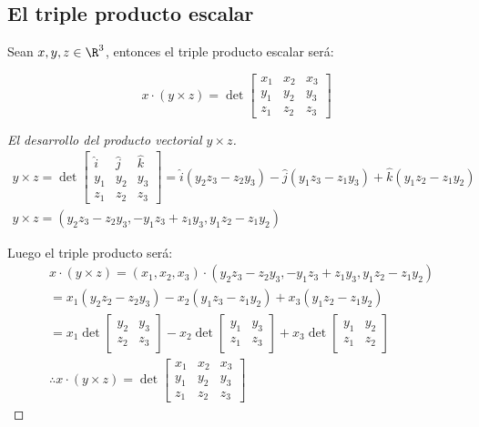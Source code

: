 \subsection{El triple producto escalar}

Sean $x,y,z\in \R^3$, entonces el triple producto escalar será:

\begin{equation}
	x\cdot\left(y\times z\right)= \det\begin{bmatrix}
		x_1 & x_2 & x_3 \\y_1&y_2&y_3\\ z_1&z_2&z_3
	\end{bmatrix}
\end{equation}

\begin{proof}[El desarrollo del producto vectorial $y\times z$]
	\begin{align*}
		y\times z=\det\begin{bmatrix}
			              \hat{i} & \hat{j} & \hat{k} \\y_1&y_2&y_3\\ z_1&z_2&z_3
		              \end{bmatrix}=\hat{i}(y_2z_3-z_2y_3)-\hat{j}(y_1z_3-z_1y_3)+\hat{k}(y_1z_2-z_1y_2) \\
		y\times z=\left(y_2z_3-z_2y_3,-y_1z_3+z_1y_3,y_1z_2-z_1y_2\right)
	\end{align*}

	Luego el triple producto será:
	\begin{align*}
		 & x\cdot(y\times z)=(x_1,x_2,x_3)\cdot(y_2z_3-z_2y_3,-y_1z_3+z_1y_3,y_1z_2-z_1y_2) \\
		 & =x_1(y_2z_2-z_2y_3)-x_2(y_1z_3-z_1y_2)+x_3(y_1z_2-z_1y_2)                        \\
		 & =x_1\det\begin{bmatrix}
			           y_2 & y_3 \\z_2&z_3
		           \end{bmatrix}-x_2\det\begin{bmatrix}
			                                y_1 & y_3 \\z_1&z_3
		                                \end{bmatrix}+x_3\det\begin{bmatrix}
			                                                     y_1 & y_2 \\z_1&z_2
		                                                     \end{bmatrix}             \\
		 & \therefore x\cdot (y\times z)=\det\begin{bmatrix}
			                                     x_1 & x_2 & x_3 \\y_1&y_2&y_3\\ z_1&z_2&z_3
		                                     \end{bmatrix}
	\end{align*}
\end{proof}

